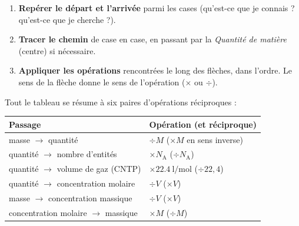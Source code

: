 \documentclass[11pt,a4paper]{article}
\newcommand{\NA}{N_{\!\text{A}}}
\begin{document}
\begin{center}
\end{center}

\begin{methode}
\begin{enumerate}[leftmargin=1.8em,topsep=2pt,itemsep=1.5pt]
  \item \textbf{Repérer le départ et l'arrivée} parmi les cases (qu'est-ce que je connais ? qu'est-ce
        que je cherche ?).
  \item \textbf{Tracer le chemin} de case en case, en passant par la \emph{Quantité de matière}
        (centre) si nécessaire.
  \item \textbf{Appliquer les opérations} rencontrées le long des flèches, dans l'ordre. Le sens de
        la flèche donne le sens de l'opération ($\times$ ou $\div$).
\end{enumerate}
\end{methode}

\begin{remarque}
Tout le tableau se résume à six paires d'opérations réciproques :
\begin{center}
\renewcommand{\arraystretch}{1.25}
\begin{tabular}{ll}
\toprule
\textbf{Passage} & \textbf{Opération (et réciproque)} \\
\midrule
masse $\to$ quantité & $\div M$ \quad($\times M$ en sens inverse) \\
quantité $\to$ nombre d'entités & $\times \NA$ \quad($\div\NA$) \\
quantité $\to$ volume de gaz (CNTP) & $\times\SI{22.4}{\litre\per\mole}$ \quad($\div 22{,}4$) \\
quantité $\to$ concentration molaire & $\div V$ \quad($\times V$) \\
masse $\to$ concentration massique & $\div V$ \quad($\times V$) \\
concentration molaire $\to$ massique & $\times M$ \quad($\div M$) \\
\bottomrule
\end{tabular}
\end{center}
\end{remarque}
\end{document}
